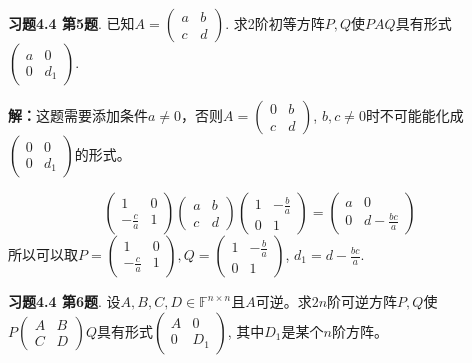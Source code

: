 \newpageorvspace

{\bf 习题4.4 第5题}. 已知$A = \begin{pmatrix} a & b \\ c & d \end{pmatrix}$. 求2阶初等方阵$P,Q$使$PAQ$具有形式$\begin{pmatrix} a & 0 \\ 0 & d_1 \end{pmatrix}$.

{\bf 解：}这题需要添加条件$a\neq 0$，否则$A = \begin{pmatrix} 0 & b \\ c & d \end{pmatrix}$, $b,c\neq 0$时不可能能化成$\begin{pmatrix} 0 & 0 \\ 0 & d_1 \end{pmatrix}$的形式。

$$\begin{pmatrix} 1 & 0 \\ -\frac{c}{a} & 1 \end{pmatrix} \begin{pmatrix} a & b \\ c & d \end{pmatrix} \begin{pmatrix} 1 & -\frac{b}{a} \\ 0 & 1 \end{pmatrix} = \begin{pmatrix} a & 0 \\ 0 & d - \frac{bc}{a} \end{pmatrix}$$
所以可以取$P = \begin{pmatrix} 1 & 0 \\ -\frac{c}{a} & 1 \end{pmatrix}, Q = \begin{pmatrix} 1 & -\frac{b}{a} \\ 0 & 1 \end{pmatrix}$, $d_1 = d - \frac{bc}{a}$.

\newpageorvspace

{\bf 习题4.4 第6题}. 设$A,B,C,D\in\mathbb{F}^{n\times n}$且$A$可逆。求$2n$阶可逆方阵$P,Q$使$P\begin{pmatrix} A & B \\ C & D \end{pmatrix}Q$具有形式$\begin{pmatrix} A & 0 \\ 0 & D_1 \end{pmatrix}$, 其中$D_1$是某个$n$阶方阵。

